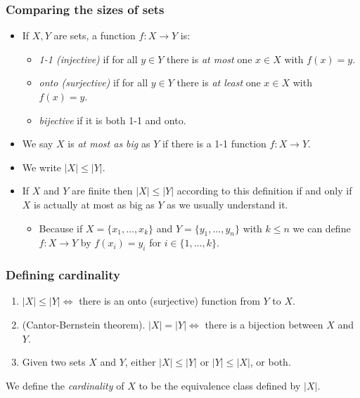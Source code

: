 \documentclass[handout]{beamer}
\begin{document}
\begin{frame}
\frametitle{Comparing the sizes of sets}
\begin{itemize}
\item If $X,Y$ are sets, a function $f:X\to Y$ is:
\begin{itemize}
\item \emph{1-1 (injective)} if for all $y\in Y$ there is \emph{at most} one $x\in X$ with $f(x) = y$.
\item \emph{onto (surjective)} if for all $y\in Y$ there is \emph{at least} one $x\in X$ with $f(x) = y$.
\item \emph{bijective} if it is both 1-1 and onto.
\end{itemize}
\item We say $X$ is \emph{at most as big} as $Y$ if there is a 1-1 function $f:X\to Y$.
\item We write $|X|\leq |Y|$.
\item If $X$ and $Y$ are finite then $|X|\leq|Y|$ according to this definition if and only if $X$ is actually at most as big as $Y$ as we usually understand it.
\begin{itemize}
\item Because if $X=\{x_1,\ldots,x_k\}$ and $Y=\{y_1,\ldots,y_n\}$ with $k\leq n$ we can define $f:X\to Y$ by $f(x_i) = y_i$ for $i\in \{1,\ldots,k\}$. 
\end{itemize}
\end{itemize}
\end{frame}

\begin{frame}
\frametitle{Defining cardinality}
\begin{fact}\mbox{}
\begin{enumerate}
\item $|X|\leq|Y|\iff$ there is an onto (surjective) function from $Y$ to $X$.
\item (Cantor-Bernstein theorem). $|X|=|Y|\iff$ there is a bijection between $X$ and $Y$.
\item Given two sets $X$ and $Y$, either $|X|\leq |Y|$ or $|Y|\leq|X|$, or both.
\end{enumerate}
\end{fact}

\begin{definition}[cardinality]
We define the \emph{cardinality} of $X$ to be the equivalence class defined by $|X|$.
\end{definition}
\end{frame}
\end{document}
